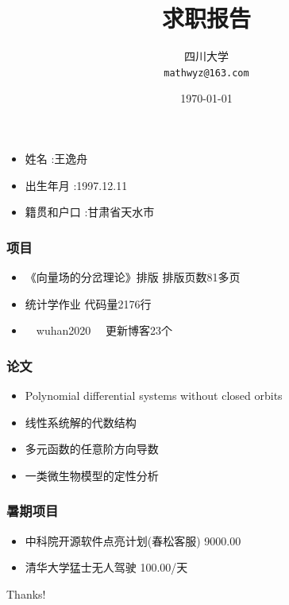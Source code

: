 \documentclass{beamer}
\title{ 求职报告}
\date{\today}
\author[王逸舟]{四川大学 \\ \texttt{mathwyz@163.com}}
\begin{document}
\begin{frame}
\titlepage
\end{frame}



\begin{frame}
  \begin{itemize}
  \item 姓名 :王逸舟
  \item 出生年月 :1997.12.11
  \item 籍贯和户口 :甘肃省天水市
  \end{itemize}
\end{frame}



\begin{frame}
  \frametitle{项目}
 \begin{itemize}
\item 《向量场的分岔理论》排版   排版页数81多页
\pause
\item  统计学作业  代码量2176行 
\pause
\item 　wuhan2020　  更新博客23个
  
\end{itemize}

\end{frame}

\begin{frame}
  \frametitle{论文}
  
  \begin{itemize}
  \item Polynomial differential systems without closed orbits
    \pause
  \item 线性系统解的代数结构
  \item 多元函数的任意阶方向导数
    \pause
  \item 一类微生物模型的定性分析
    \pause
  \end{itemize}
  
\end{frame}

\begin{frame}
  \frametitle{暑期项目}
  \begin{itemize}
  \item 中科院开源软件点亮计划(春松客服) 9000.00
    \pause
  \item 清华大学猛士无人驾驶 100.00/天
    \pause
  \end{itemize}
\end{frame}

\begin{frame}
  \begin{center}
{\Huge \calligra Thanks!}
  \end{center}
\end{frame}
\end{document}
